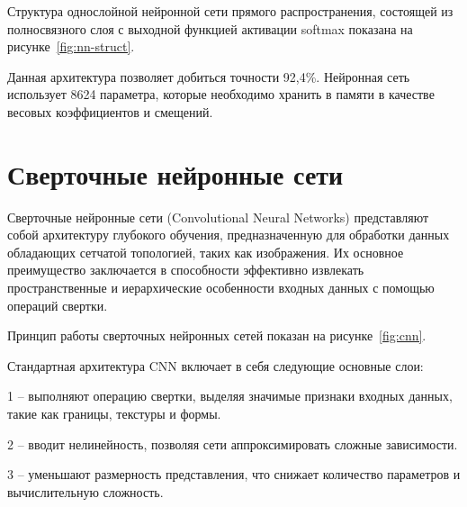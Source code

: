 \anonsection{}Структура однослойной нейронной сети прямого распространения, 
состоящей из полносвязного слоя с выходной функцией активации softmax показана 
на рисунке~\ref{fig:nn-struct}.


Данная архитектура позволяет добиться точности 92,4\%\cite{Doc}. Нейронная сеть 
использует 8624 параметра, которые необходимо хранить в памяти в качестве 
весовых коэффициентов и смещений.

\section{Сверточные нейронные сети}
\hspace*{12.5 mm}
Сверточные нейронные сети (Convolutional Neural Networks) представляют собой 
архитектуру глубокого обучения, предназначенную для обработки данных обладающих 
сетчатой топологией, таких как изображения. Их основное преимущество 
заключается в способности эффективно извлекать пространственные и иерархические 
особенности входных данных с помощью операций свертки.

Принцип работы сверточных нейронных сетей показан на рисунке~\ref{fig:cnn}\cite{CNN}.


\anonsection{}Стандартная архитектура CNN включает в себя следующие основные 
слои:

    1  – выполняют операцию свертки, выделяя значимые 
признаки входных данных, такие как границы, текстуры и формы. 

    2  – вводит нелинейность, позволяя сети 
аппроксимировать сложные зависимости.\@

    3  – уменьшают размерность представления, 
что снижает количество параметров и вычислительную сложность.


